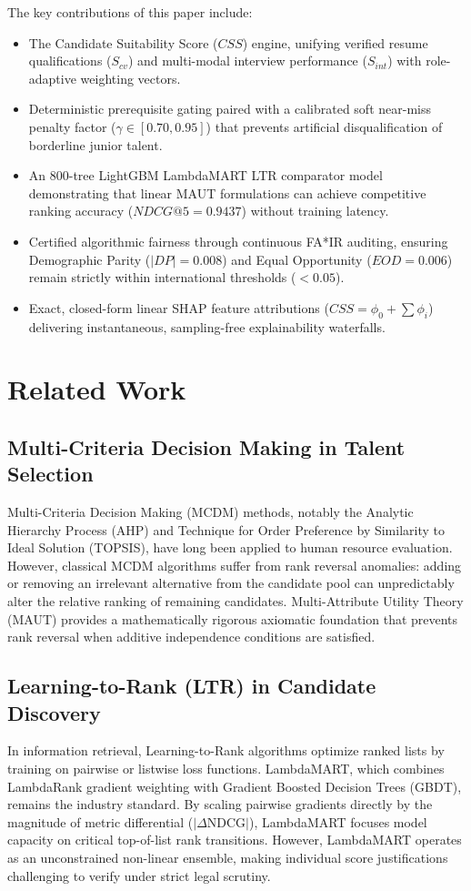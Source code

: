\documentclass[conference]{IEEEtran}
\begin{document}
The key contributions of this paper include:
\begin{itemize}
    \item The Candidate Suitability Score ($CSS$) engine, unifying verified resume qualifications ($S_{cv}$) and multi-modal interview performance ($S_{int}$) with role-adaptive weighting vectors.
    \item Deterministic prerequisite gating paired with a calibrated soft near-miss penalty factor ($\gamma \in [0.70, 0.95]$) that prevents artificial disqualification of borderline junior talent.
    \item An 800-tree LightGBM LambdaMART LTR comparator model demonstrating that linear MAUT formulations can achieve competitive ranking accuracy ($NDCG@5 = 0.9437$) without training latency.
    \item Certified algorithmic fairness through continuous FA*IR auditing, ensuring Demographic Parity ($|DP| = 0.008$) and Equal Opportunity ($EOD = 0.006$) remain strictly within international thresholds ($< 0.05$).
    \item Exact, closed-form linear SHAP feature attributions ($CSS = \phi_0 + \sum \phi_i$) delivering instantaneous, sampling-free explainability waterfalls.
\end{itemize}

\section{Related Work}

\subsection{Multi-Criteria Decision Making in Talent Selection}
Multi-Criteria Decision Making (MCDM) methods, notably the Analytic Hierarchy Process (AHP) and Technique for Order Preference by Similarity to Ideal Solution (TOPSIS), have long been applied to human resource evaluation. However, classical MCDM algorithms suffer from rank reversal anomalies: adding or removing an irrelevant alternative from the candidate pool can unpredictably alter the relative ranking of remaining candidates. Multi-Attribute Utility Theory (MAUT) provides a mathematically rigorous axiomatic foundation that prevents rank reversal when additive independence conditions are satisfied.

\subsection{Learning-to-Rank (LTR) in Candidate Discovery}
In information retrieval, Learning-to-Rank algorithms optimize ranked lists by training on pairwise or listwise loss functions. LambdaMART, which combines LambdaRank gradient weighting with Gradient Boosted Decision Trees (GBDT), remains the industry standard. By scaling pairwise gradients directly by the magnitude of metric differential ($|\Delta\text{NDCG}|$), LambdaMART focuses model capacity on critical top-of-list rank transitions. However, LambdaMART operates as an unconstrained non-linear ensemble, making individual score justifications challenging to verify under strict legal scrutiny.
\end{document}
